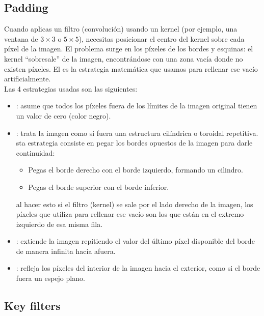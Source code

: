 \subsection{Padding}
\noindent
Cuando aplicas un filtro (convolución) usando un kernel (por ejemplo, una ventana de $3\times3$ o $5\times5$), necesitas posicionar el centro del kernel sobre cada píxel de la imagen. El problema surge en los píxeles de los bordes y esquinas: el kernel ``sobresale'' de la imagen, encontrándose con una zona vacía donde no existen píxeles. El  es la estrategia matemática que usamos para rellenar ese vacío artificialmente. \\

\noindent
Las 4 estrategias usadas son las siguientes:
\begin{itemize}
    \item {}: asume que todos los píxeles fuera de los límites de la imagen original tienen un valor de cero (color negro).
    \item {}: trata la imagen como si fuera una estructura cilíndrica o toroidal repetitiva. sta estrategia consiste en pegar los bordes opuestos de la imagen para darle continuidad:
    \begin{itemize}
        \item Pegas el borde derecho con el borde izquierdo, formando un cilindro.
        \item Pegas el borde superior con el borde inferior.
    \end{itemize}
    al hacer esto si el filtro (kernel) se sale por el lado derecho de la imagen, los píxeles que utiliza para rellenar ese vacío son los que están en el extremo izquierdo de esa misma fila.
    \item {}: extiende la imagen repitiendo el valor del último píxel disponible del borde de manera infinita hacia afuera.
    \item {}: refleja los píxeles del interior de la imagen hacia el exterior, como si el borde fuera un espejo plano.
\end{itemize}


\subsection{Key filters}

